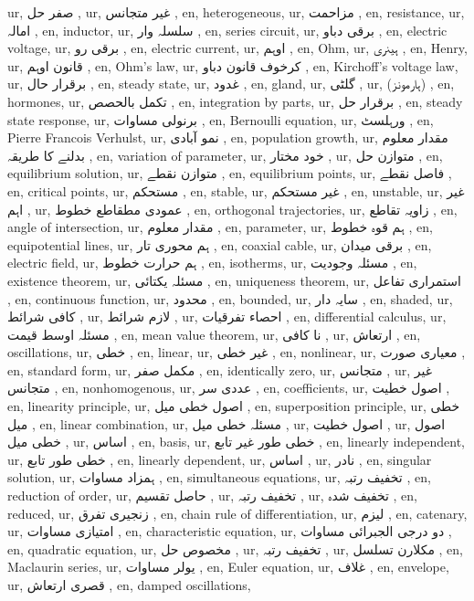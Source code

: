 ur, صفر حل ,
ur, غیر متجانس ,
en, heterogeneous,
ur, مزاحمت ,
en, resistance,
ur, امالہ ,
en, inductor,
ur, سلسلہ وار ,
en, series circuit,
ur, برقی دباو ,
en, electric voltage,
ur, برقی رو ,
en, electric current,
ur, اوہم ,
en, Ohm,
ur, ہینری ,
en, Henry,
ur, قانون اوہم ,
en, Ohm's law,
ur, کرخوف قانون دباو ,
en, Kirchoff's voltage law,
ur, برقرار حال ,
en, steady state,
ur, غدود ,
en, gland,
ur, گلٹی ,
ur, (ہارمونز) ,
en, hormones,
ur, تکمل بالحصص ,
en, integration by parts,
ur, برقرار حل ,
en, steady state response,
ur, برنولی مساوات ,
en, Bernoulli equation,
ur, ورہلسٹ ,
en, Pierre Francois Verhulst,
ur, نمو آبادی ,
en, population growth,
ur, مقدار معلوم بدلنے کا طریقہ ,
en, variation of parameter,
ur, خود مختار ,
ur, متوازن حل ,
en, equilibrium solution,
ur, متوازن نقطے ,
en, equilibrium points,
ur, فاصل نقطے ,
en, critical points,
ur, مستحکم ,
en, stable,
ur, غیر مستحکم ,
en, unstable,
ur, غیر اہم ,
ur, عمودی مطقاطع خطوط ,
en, orthogonal trajectories,
ur, زاویہ تقاطع ,
en, angle of intersection,
ur, مقدار معلوم ,
en, parameter,
ur, ہم قوہ خطوط ,
en, equipotential lines,
ur, ہم محوری تار ,
en, coaxial cable,
ur, برقی میدان ,
en, electric field,
ur, ہم حرارت خطوط ,
en, isotherms,
ur, مسئلہ وجودیت ,
en, existence theorem,
ur, مسئلہ یکتائی ,
en, uniqueness theorem,
ur, استمراری تفاعل ,
en, continuous function,
ur, محدود ,
en, bounded,
ur, سایہ دار ,
en, shaded,
ur, کافی شرائط ,
ur, لازم شرائط ,
ur, احصاء تفرقیات ,
en, differential calculus,
ur, مسئلہ اوسط قیمت ,
en, mean value theorem,
ur, نا کافی ,
ur, ارتعاش ,
en, oscillations,
ur, خطی ,
en, linear,
ur, غیر خطی ,
en, nonlinear,
ur, معیاری صورت ,
en, standard form,
ur, مکمل صفر ,
en, identically zero,
ur, متجانس ,
ur, غیر متجانس ,
en, nonhomogenous,
ur, عددی سر ,
en, coefficients,
ur, اصول خطیت ,
en, linearity principle,
ur, اصول خطی میل ,
en, superposition principle,
ur, خطی میل ,
en, linear combination,
ur, مسئلہ خطی میل ,
ur, اصول خطیت ,
ur, اصول خطی میل ,
ur, اساس ,
en, basis,
ur, خطی طور غیر تابع ,
en, linearly independent,
ur, خطی طور تابع ,
en, linearly dependent,
ur, اساس ,
ur, نادر ,
en, singular solution,
ur, ہمزاد مساوات ,
en, simultaneous equations,
ur, تخفیف رتبہ ,
en, reduction of order,
ur, حاصل تقسیم ,
ur, تخفیف رتبہ ,
ur, تخفیف شدہ ,
en, reduced,
ur, زنجیری تفرق ,
en, chain rule of differentiation,
ur, لیزم ,
en, catenary,
ur, امتیازی مساوات ,
en, characteristic equation,
ur, دو درجی الجبرائی مساوات ,
en, quadratic equation,
ur, مخصوص حل ,
ur, تخفیف رتبہ ,
ur, مکلارن تسلسل ,
en, Maclaurin series,
ur, یولر مساوات ,
en, Euler equation,
ur, غلاف ,
en, envelope,
ur, قصری ارتعاش ,
en, damped oscillations,
